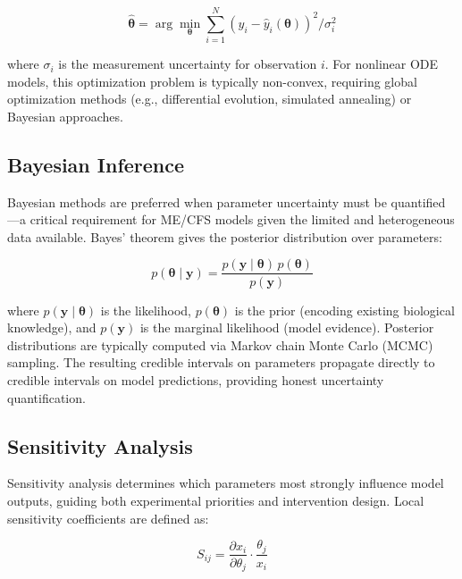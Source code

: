 \begin{equation}
\label{eq:least-squares}
\hat{\boldsymbol{\theta}} = \arg\min_{\boldsymbol{\theta}} \sum_{i=1}^{N} \left( y_i - \hat{y}_i(\boldsymbol{\theta}) \right)^2 / \sigma_i^2
\end{equation}

where $\sigma_i$ is the measurement uncertainty for observation $i$. For nonlinear ODE models, this optimization problem is typically non-convex, requiring global optimization methods (e.g., differential evolution, simulated annealing) or Bayesian approaches.

\subsection{Bayesian Inference}

Bayesian methods are preferred when parameter uncertainty must be quantified---a critical requirement for ME/CFS models given the limited and heterogeneous data available. Bayes' theorem gives the posterior distribution over parameters:

\begin{equation}
\label{eq:bayes}
p(\boldsymbol{\theta} \mid \mathbf{y}) = \frac{p(\mathbf{y} \mid \boldsymbol{\theta}) \, p(\boldsymbol{\theta})}{p(\mathbf{y})}
\end{equation}

where $p(\mathbf{y} \mid \boldsymbol{\theta})$ is the likelihood, $p(\boldsymbol{\theta})$ is the prior (encoding existing biological knowledge), and $p(\mathbf{y})$ is the marginal likelihood (model evidence). Posterior distributions are typically computed via Markov chain Monte Carlo (MCMC) sampling. The resulting credible intervals on parameters propagate directly to credible intervals on model predictions, providing honest uncertainty quantification.

\subsection{Sensitivity Analysis}

Sensitivity analysis determines which parameters most strongly influence model outputs, guiding both experimental priorities and intervention design. Local sensitivity coefficients are defined as:

\begin{equation}
\label{eq:sensitivity}
S_{ij} = \frac{\partial x_i}{\partial \theta_j} \cdot \frac{\theta_j}{x_i}
\end{equation}

